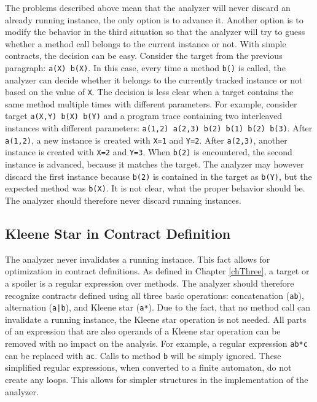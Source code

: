 The problems described above mean that the analyzer will never discard an
already running instance, the only option is to advance it. Another option is to
modify the behavior in the third situation so that the analyzer will try to
guess whether a method call belongs to the current instance or not. With simple
contracts, the decision can be easy. Consider the target from the previous
paragraph: \texttt{a(X) b(X)}. In this case, every time a method \texttt{b()} is
called, the analyzer can decide whether it belongs to the currently tracked
instance or not based on the value of \texttt{X}. The decision is less clear
when a target contains the same method multiple times with different parameters.
For example, consider target \texttt{a(X,Y) b(X) b(Y)} and a program trace
containing two interleaved instances with different parameters: \texttt{a(1,2)
a(2,3) b(2) b(1) b(2) b(3)}. After \texttt{a(1,2)}, a new instance is created
with \texttt{X=1} and \texttt{Y=2}. After \texttt{a(2,3)}, another instance is
created with \texttt{X=2} and \texttt{Y=3}. When \texttt{b(2)} is encountered,
the second instance is advanced, because it matches the target. The analyzer may
however discard the first instance because \texttt{b(2)} is contained in the
target as \texttt{b(Y)}, but the expected method was \texttt{b(X)}. It is not
clear, what the proper behavior should be. The analyzer should therefore never
discard running instances.

\subsection{Kleene Star in Contract Definition}

The analyzer never invalidates a running instance. This fact allows for
optimization in contract definitions. As defined in Chapter \ref{chThree}, a
target or a spoiler is a regular expression over methods. The analyzer should
therefore recognize contracts defined using all three basic operations:
concatenation (\texttt{ab}), alternation (\texttt{a|b}), and Kleene star
(\texttt{a*}). Due to the fact, that no method call can invalidate a running
instance, the Kleene star operation is not needed. All parts of an expression
that are also operands of a Kleene star operation can be removed with no impact
on the analysis. For example, a regular expression \texttt{ab*c} can be replaced
with \texttt{ac}. Calls to method \texttt{b} will be simply ignored. These
simplified regular expressions, when converted to a finite automaton, do not
create any loops. This allows for simpler structures in the implementation of
the analyzer.

